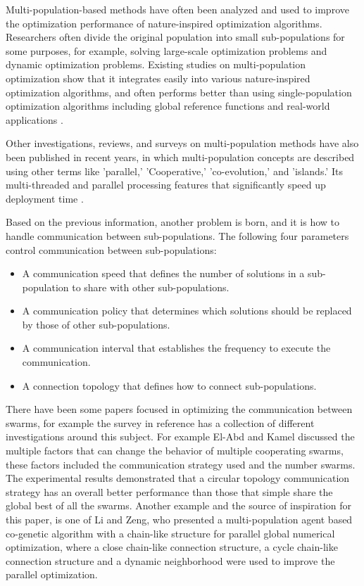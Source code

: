 \documentclass[runningheads]{llncs}
\begin{document}
Multi-population-based methods have often been analyzed and used to improve the optimization performance of nature-inspired optimization algorithms. Researchers often divide the original population into small sub-populations for some purposes, for example, solving large-scale optimization problems and dynamic optimization problems. Existing studies on multi-population optimization show that it integrates easily into various nature-inspired optimization algorithms, and often performs better than using single-population optimization algorithms including global reference functions and real-world applications \cite{b11}\cite{b12}.

Other investigations, reviews, and surveys on multi-population methods have also been published in recent years, in which multi-population concepts are described using other terms like  'parallel,' 'Cooperative,' 'co-evolution,' and 'islands.' Its multi-threaded and parallel processing features that significantly speed up deployment time \cite{b13}\cite{b14}.

Based on the previous information, another problem is born, and it is how to handle communication between sub-populations. The following four parameters control communication between sub-populations: 
\begin{itemize}
    \item A communication speed that defines the number of solutions in a sub-population to share with other sub-populations.
    \item A communication policy that determines which solutions should be replaced by those of other sub-populations.
    \item A communication interval that establishes the frequency to execute the communication.
    \item A connection topology that defines how to connect sub-populations.

\end{itemize}

There have been some papers focused in optimizing the communication between swarms, for example the survey in reference \cite{b15} has a collection of different investigations around this subject. For example El-Abd and Kamel discussed the multiple factors that can change the behavior of multiple cooperating swarms, these factors included the communication strategy used and the number swarms. The experimental results demonstrated that a circular topology communication strategy has an overall better performance than those that simple share the global best of all the swarms\cite{b16}.
Another example and the source of inspiration for this paper, is one of Li and Zeng, who presented a multi-population agent based co-genetic algorithm with a chain-like structure for parallel global numerical optimization, where a close chain-like connection structure, a cycle chain-like connection structure and a dynamic neighborhood were used to improve the parallel optimization\cite{b17}.
\end{document}
